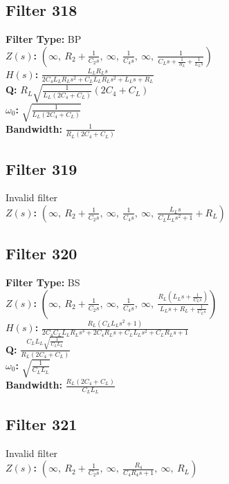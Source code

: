 \documentclass{article}
\begin{document}
\subsection*{Filter 318}
\textbf{Filter Type:} BP \\ 
\textbf{$Z(s)$:} $\left( \infty, \  R_{2} + \frac{1}{C_{2} s}, \  \infty, \  \frac{1}{C_{4} s}, \  \infty, \  \frac{1}{C_{L} s + \frac{1}{R_{L}} + \frac{1}{L_{L} s}}\right)$ \\ 
\textbf{$H(s)$:} $\frac{L_{L} R_{L} s}{2 C_{4} L_{L} R_{L} s^{2} + C_{L} L_{L} R_{L} s^{2} + L_{L} s + R_{L}}$ \\ 
\textbf{Q:} $R_{L} \sqrt{\frac{1}{L_{L} \left(2 C_{4} + C_{L}\right)}} \left(2 C_{4} + C_{L}\right)$ \\ 
\textbf{$\omega_0$:} $\sqrt{\frac{1}{L_{L} \left(2 C_{4} + C_{L}\right)}}$ \\ 
\textbf{Bandwidth:} $\frac{1}{R_{L} \left(2 C_{4} + C_{L}\right)}$ \\ 
\subsection*{Filter 319}
Invalid filter \\ 
\textbf{$Z(s)$:} $\left( \infty, \  R_{2} + \frac{1}{C_{2} s}, \  \infty, \  \frac{1}{C_{4} s}, \  \infty, \  \frac{L_{L} s}{C_{L} L_{L} s^{2} + 1} + R_{L}\right)$ \\ 
\subsection*{Filter 320}
\textbf{Filter Type:} BS \\ 
\textbf{$Z(s)$:} $\left( \infty, \  R_{2} + \frac{1}{C_{2} s}, \  \infty, \  \frac{1}{C_{4} s}, \  \infty, \  \frac{R_{L} \left(L_{L} s + \frac{1}{C_{L} s}\right)}{L_{L} s + R_{L} + \frac{1}{C_{L} s}}\right)$ \\ 
\textbf{$H(s)$:} $\frac{R_{L} \left(C_{L} L_{L} s^{2} + 1\right)}{2 C_{4} C_{L} L_{L} R_{L} s^{3} + 2 C_{4} R_{L} s + C_{L} L_{L} s^{2} + C_{L} R_{L} s + 1}$ \\ 
\textbf{Q:} $\frac{C_{L} L_{L} \sqrt{\frac{1}{C_{L} L_{L}}}}{R_{L} \left(2 C_{4} + C_{L}\right)}$ \\ 
\textbf{$\omega_0$:} $\sqrt{\frac{1}{C_{L} L_{L}}}$ \\ 
\textbf{Bandwidth:} $\frac{R_{L} \left(2 C_{4} + C_{L}\right)}{C_{L} L_{L}}$ \\ 
\subsection*{Filter 321}
Invalid filter \\ 
\textbf{$Z(s)$:} $\left( \infty, \  R_{2} + \frac{1}{C_{2} s}, \  \infty, \  \frac{R_{4}}{C_{4} R_{4} s + 1}, \  \infty, \  R_{L}\right)$ \\ 
\end{document}
